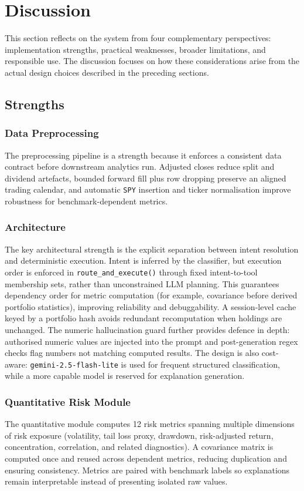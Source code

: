 \section{Discussion}
\label{sec:discussion}

This section reflects on the system from four complementary perspectives: implementation strengths, practical weaknesses, broader limitations, and responsible use. The discussion focuses on how these considerations arise from the actual design choices described in the preceding sections.

\subsection{Strengths}

\subsubsection{Data Preprocessing}
The preprocessing pipeline is a strength because it enforces a consistent data contract before downstream analytics run. Adjusted closes reduce split and dividend artefacts, bounded forward fill plus row dropping preserve an aligned trading calendar, and automatic \texttt{SPY} insertion and ticker normalisation improve robustness for benchmark-dependent metrics.

\subsubsection{Architecture}
The key architectural strength is the explicit separation between intent resolution and deterministic execution. Intent is inferred by the classifier, but execution order is enforced in \texttt{route\_and\_execute()} through fixed intent-to-tool membership sets, rather than unconstrained LLM planning. This guarantees dependency order for metric computation (for example, covariance before derived portfolio statistics), improving reliability and debuggability. A session-level cache keyed by a portfolio hash avoids redundant recomputation when holdings are unchanged. The numeric hallucination guard further provides defence in depth: authorised numeric values are injected into the prompt and post-generation regex checks flag numbers not matching computed results. The design is also cost-aware: \texttt{gemini-2.5-flash-lite} is used for frequent structured classification, while a more capable model is reserved for explanation generation.

\subsubsection{Quantitative Risk Module}
The quantitative module computes 12 risk metrics spanning multiple dimensions of risk exposure (volatility, tail loss proxy, drawdown, risk-adjusted return, concentration, correlation, and related diagnostics). A covariance matrix is computed once and reused across dependent metrics, reducing duplication and ensuring consistency. Metrics are paired with benchmark labels so explanations remain interpretable instead of presenting isolated raw values.

